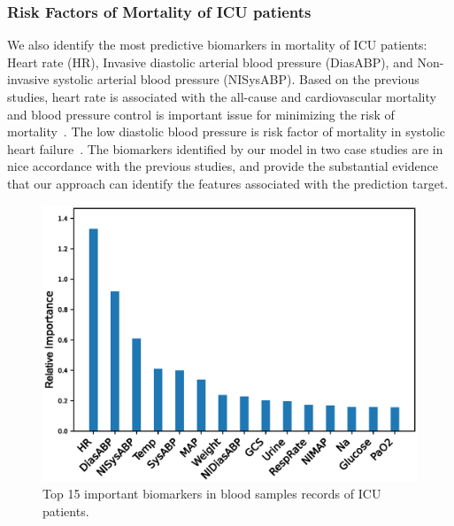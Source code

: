 \subsubsection{Risk Factors of Mortality of ICU patients}
We also identify the most predictive biomarkers in mortality of ICU patients: Heart rate (HR), Invasive diastolic arterial blood pressure (DiasABP), and Non-invasive systolic arterial blood pressure (NISysABP). Based on the previous studies, heart rate is associated with the all-cause and cardiovascular mortality~\cite{zhang2016resting} and blood pressure control is important issue for minimizing the risk of mortality~\cite{wei2020optimal}. The low diastolic blood pressure is risk factor of mortality in systolic heart failure~\cite{javaheri2007central}. The biomarkers identified by our model in two case studies are in nice accordance with the previous studies, and provide the substantial evidence that our approach can identify the features associated with the prediction target.
\begin{figure}[h]
    \raggedright
    \includegraphics[width=1.0\linewidth]{figures/icu-biomarkers.eps}
    \caption{Top 15 important biomarkers in blood samples records of ICU patients.} \label{fig: identified-features ICU}
\end{figure}